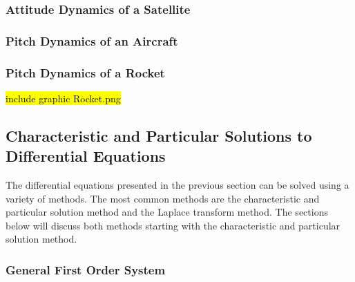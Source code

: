 \subsubsection{Attitude Dynamics of a Satellite}

\subsubsection{Pitch Dynamics of an Aircraft}

\subsubsection{Pitch Dynamics of a Rocket}

\hl{include graphic Rocket.png}

\subsection{Characteristic and Particular Solutions to Differential Equations}

The differential equations presented in the previous section can be solved using a variety of methods. The most common methods are the characteristic and particular solution method and the Laplace transform method. The sections below will discuss both methods starting with the characteristic and particular solution method.

\subsubsection{General First Order System}

